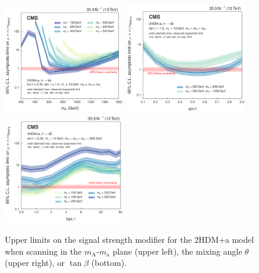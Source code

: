 \begin{figure}[htbp]
  \centering
  \includegraphics[width=0.475\textwidth]{figures/limits/limits_2hdma_mass.pdf}
  \includegraphics[width=0.475\textwidth]{figures/limits/limits_2hdma_sinp.pdf}\\
  \includegraphics[width=0.475\textwidth]{figures/limits/limits_2hdma_tanb.pdf}\\
  \caption{Upper limits on the signal strength modifier for the 2HDM+a model when scanning in the $m_\text{A}$-$m_\text{a}$ plane (upper left), the mixing angle $\theta$ (upper right), or $\tan\beta$ (bottom).}
  \label{fig:limits_2hdma}
\end{figure}


